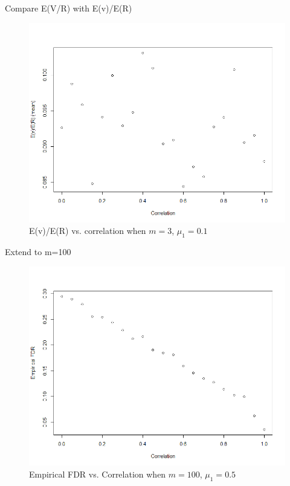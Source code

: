 \documentclass{beamer}
\begin{document}
\begin{frame}[t]{Compare E(V/R) with E(v)/E(R)}\vspace{10pt}

\begin{figure}[h]
	\centering
	\includegraphics[scale=0.35]{EvEr_m=3_2}
	\caption{\footnotesize{E(v)/E(R) vs. correlation when $m=3$, $\mu_1=0.1$}}
	\label{fig6}
\end{figure}

\end{frame}

\begin{frame}[t]{Extend to m=100}\vspace{10pt}

\begin{figure}[h]
	\centering
	\includegraphics[scale=0.35]{fdrVSrho_m=100_1}
	\caption{\footnotesize{Empirical FDR vs. Correlation when $m=100$, $\mu_1=0.5$}}
	\label{fig7}
\end{figure}

\end{frame}
\end{document}

